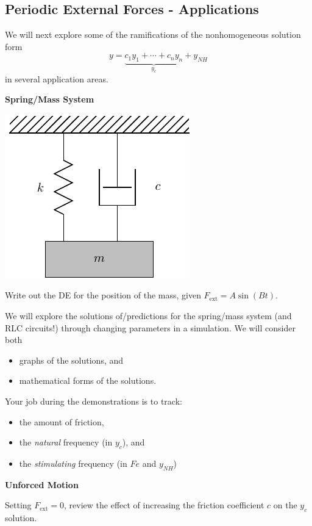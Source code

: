 \newpage
{}
\subsection*{Periodic External Forces - Applications}
We will next explore some of the ramifications of the nonhomogeneous solution form
$$y = \underbrace{c_1 y_1 + \dotsb + c_n y_n}_{y_c} + y_{NH}$$
in several application areas.

\newpage
{\bf Spring/Mass System}

 \includegraphics[width=0.4\linewidth]{graphics/notes_08_hanging_mass}

 \problem Write out the DE for the position of the mass, given
 $F_{\mbox{ext}} = A \sin(Bt)$.

\newpage


We will explore the solutions of/predictions for the spring/mass
system (and RLC circuits!) through changing parameters in a
simulation.  We will consider both
\begin{itemize}
\item graphs of the solutions, and 
\item mathematical forms of the solutions.
\end{itemize}

Your job during the demonstrations is to track:
\begin{itemize}
\item the amount of friction,
\item the {\em natural} frequency (in $y_c$), and
\item the {\em stimulating} frequency (in $Fe$ and $y_{NH}$)
\end{itemize}

\newpage

{\bf Unforced Motion}

Setting $F_{\mbox{ext}} = 0$, review the effect of
  increasing the friction coefficient $c$ on the $y_c$ solution.

